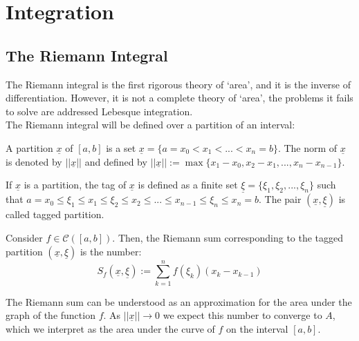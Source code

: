 \chapter{Integration}

\section{The Riemann Integral}

The Riemann integral is the first rigorous theory of `area', and it is the inverse of differentiation. However, it is not a complete theory of `area', the problems it fails to solve are addressed Lebesque integration. \\

The Riemann integral will be defined over a partition of an interval:

\begin{definition}[Partition]
    A partition $\underline{x}$ of $[a,b]$ is a set $\underline{x} = \{a = x_0 < x_1 < ... < x_n = b \}$. The norm of $\underline{x}$ is denoted by $||\underline{x}||$ and defined by $||\underline{x}||:= \max \{x_1 - x_0, x_2 - x_1, ..., x_n - x_{n-1} \}$.
\end{definition}

\begin{definition}[Tag]
    If $\underline{x}$ is a partition, the tag of $\underline{x}$ is defined as a finite set $\underline{\xi} = \{ \xi_1, \xi_2, ..., \xi_n\}$ such that $a = x_0 \leq \xi_1 \leq x_1 \leq \xi_2 \leq x_2 \leq ... \leq x_{n-1} \leq \xi_n \leq x_n = b$. The pair $(\underline{x}, \underline{\xi})$ is called tagged partition.
\end{definition}

\begin{definition}
    Consider $f \in \mathcal{C}([a,b])$. Then, the Riemann sum corresponding to the tagged partition $(\underline{x}, \underline{\xi})$ is the number:
    \begin{equation}
        S_f(\underline{x}, \underline{\xi}):= \sum \limits_{k=1}^n f(\xi_k)(x_k - x_{k-1})
    \end{equation}
\end{definition}

The Riemann sum can be understood as an approximation for the area under the graph of the function $f$. As $||\underline{x}|| \to 0$ we expect this number to converge to $A$, which we interpret as the area under the curve of $f$ on the interval $[a,b]$.

